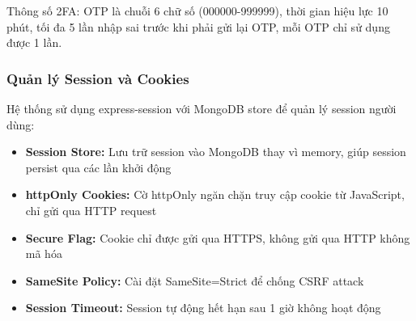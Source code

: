 \documentclass[12pt,a4paper]{article}
\begin{document}
Thông số 2FA: OTP là chuỗi 6 chữ số (000000-999999), thời gian hiệu lực 10 phút, tối đa 5 lần nhập sai trước khi phải gửi lại OTP, mỗi OTP chỉ sử dụng được 1 lần.

\subsubsection{Quản lý Session và Cookies}

Hệ thống sử dụng express-session với MongoDB store để quản lý session người dùng:

\begin{itemize}
  \item \textbf{Session Store:} Lưu trữ session vào MongoDB thay vì memory, giúp session persist qua các lần khởi động
  \item \textbf{httpOnly Cookies:} Cờ httpOnly ngăn chặn truy cập cookie từ JavaScript, chỉ gửi qua HTTP request
  \item \textbf{Secure Flag:} Cookie chỉ được gửi qua HTTPS, không gửi qua HTTP không mã hóa
  \item \textbf{SameSite Policy:} Cài đặt SameSite=Strict để chống CSRF attack
  \item \textbf{Session Timeout:} Session tự động hết hạn sau 1 giờ không hoạt động
\end{itemize}
\end{document}
